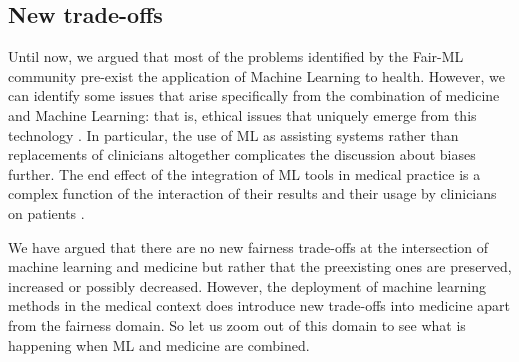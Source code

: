 




\subsection{New trade-offs}
    Until now, we argued that most of the problems identified by the Fair-ML community pre-exist the application of Machine Learning to health.
    However, we can identify some issues that arise specifically from the combination of medicine and Machine Learning: that is, ethical issues that uniquely emerge from this technology \cite{Dijkstra2020}.
    In particular, the use of ML as assisting systems rather than replacements of clinicians altogether complicates the discussion about biases further.
    The end effect of the integration of ML tools in medical practice is a complex function of the interaction of their results and their usage by clinicians on patients \cite[p.~4]{Rajkomar2018}.



We have argued that there are no new fairness trade-offs at the intersection of machine learning and medicine but rather that the preexisting ones are preserved, increased or possibly decreased. However, the deployment of machine learning methods in the medical context does introduce new trade-offs into medicine apart from the fairness domain. So let us zoom out of this domain to see what is happening when ML and medicine are combined. 

